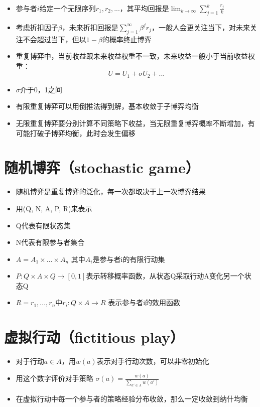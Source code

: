 \documentclass[
]{book}
\providecommand{\tightlist}{%
  \setlength{\itemsep}{0pt}\setlength{\parskip}{0pt}}
\begin{document}
\begin{itemize}
\tightlist
\item
  参与者\(i\)给定一个无限序列\(r_1,r_2,...\)，其平均回报是\(\lim_{k\rightarrow\infty}\sum_{j=1}^k\frac{r_j}{k}\)
\item
  考虑折扣因子\(\beta\)，未来折扣回报是\(\sum_{j=1}^{\infty}\beta^jr_j\)，一般人会更关注当下，对未来关注不会超过当下，但以\(1-\beta\)的概率终止博弈
\item
  重复博弈中，当前收益跟未来收益权重不一致，未来收益一般小于当前收益权重：
  \[U = U_1 + \sigma U_2+ ...\]
\item
  \(\sigma\)介于0，1之间
\item
  有限重复博弈可以用倒推法得到解，基本收敛于子博弈均衡
\item
  无限重复博弈要分别计算不同策略下收益，当无限重复博弈概率不断增加，有可能打破子博弈均衡，此时会发生偏移
\end{itemize}

\hypertarget{ux968fux673aux535aux5f08stochastic-game}{%
\section{随机博弈（stochastic game）}\label{ux968fux673aux535aux5f08stochastic-game}}

\begin{itemize}
\tightlist
\item
  随机博弈是重复博弈的泛化，每一次都取决于上一次博弈结果
\item
  用(Q, N, A, P, R)来表示
\item
  Q代表有限状态集
\item
  N代表有限参与者集合
\item
  \(A = A_1 \times ... \times A_n\) 其中\(A_i\)是参与者i的有限行动集
\item
  \(P:Q \times A \times Q \rightarrow[0,1]\)表示转移概率函数，从状态Q采取行动A变化另一个状态Q
\item
  \(R = r_1,...,r_n\)中\(r_i:Q\times A\rightarrow R\) 表示参与者i的效用函数
\end{itemize}

\hypertarget{ux865aux62dfux884cux52a8fictitious-play}{%
\section{虚拟行动（fictitious play）}\label{ux865aux62dfux884cux52a8fictitious-play}}

\begin{itemize}
\tightlist
\item
  对于行动\(a\in A\)，用\(w(a)\)表示对手行动次数，可以非零初始化
\item
  用这个数字评价对手策略 \(\sigma(a) = \frac{w(a)}{\sum_{a' \in A}w(a')}\)
\item
  在虚拟行动中每一个参与者的策略经验分布收敛，那么一定收敛到纳什均衡
\end{itemize}
\end{document}
